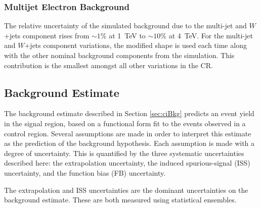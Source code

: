 
\subsubsection{Multijet Electron Background}

The relative uncertainty of the simulated background due to the multi-jet and $W$+jets component rises from $\sim1\%$ at 1~TeV to $\sim10\%$ at 4~TeV.
For the multi-jet and $W$+jets component variations, the modified shape is used each time along with the other nominal background components from the simulation.
This contribution is the smallest amongst all other variations in the CR.

\subsection{Background Estimate}\label{sec:ciSystBkg}
The background estimate described in Section \ref{sec:ciBkg} predicts an event yield in the signal region, based on a functional form fit to the events observed in a control region.
Several assumptions are made in order to interpret this estimate as the prediction of the background hypothesis.
Each assumption is made with a degree of uncertainty.
This is quantified by the three systematic uncertainties described here: the extrapolation uncertainty, the induced spurious-signal (ISS) uncertainty, and the function bias (FB) uncertainty.

The extrapolation and ISS uncertainties are the dominant uncertainties on the background estimate.
These are both measured using statistical ensembles.

